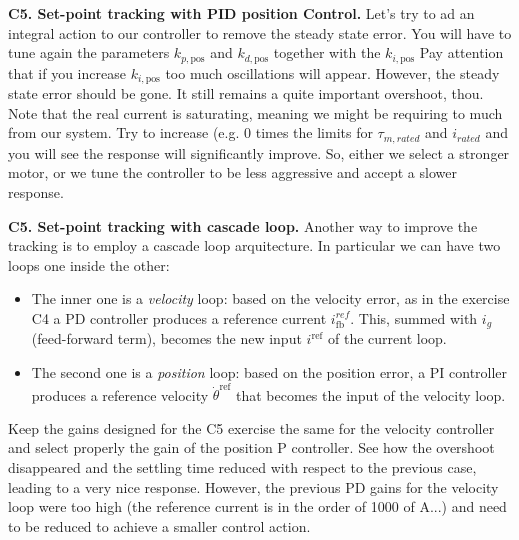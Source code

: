 \documentclass[11pt]{article}
\begin{document}
\textbf{C5. Set-point tracking with PID position Control. }
Let's try to ad an integral action to our controller to remove the steady state error. 
You will have to tune again the parameters $k_{p, \mathrm{pos}}$ and $k_{d, \mathrm{pos}}$ together with the $k_{i, \mathrm{pos}}$
Pay attention that if you increase  $k_{i, \mathrm{pos}}$ too much oscillations will appear. 
However, the steady state error should be gone. It still remains a quite important overshoot, thou.
Note that the real current is saturating, meaning we might be requiring to much from our system.
Try to increase (e.g. 0 times the limits for $\tau_{m,rated}$ and $i_{rated}$ 
and you will see the response will significantly  improve. So, either we select a stronger motor, or we 
tune the controller to be less aggressive and accept a slower response.


\textbf{C5. Set-point tracking with cascade loop. }
Another way to improve the tracking is to employ a cascade loop arquitecture. 
In particular we can have two loops one inside the other: 

\begin{itemize}
    \item The inner one is a \textit{velocity} loop: based on the velocity error, as in the exercise C4  
    a PD controller produces a reference current $i^{ref}_{\mathrm{fb}}$. This, summed with $i_g$ (feed-forward term), becomes the new input $i^\mathrm{ref}$ of the current loop. 
    \item The second one is a \textit{position} loop: based on the position error, a PI controller produces a reference velocity $\dot{\theta}^\mathrm{ref}$ that becomes the input of the velocity loop.
\end{itemize}
%
Keep the gains designed for the C5 exercise the same for the velocity controller and 
select properly the gain of the position P controller. 
See how the overshoot disappeared and the settling time reduced 
with respect to the previous case, leading to a very nice response. 
However, the previous PD gains for the velocity loop were too high (the reference current is in the order of 1000 of A...)
and need to be reduced to achieve a smaller control action. 
\end{document}

